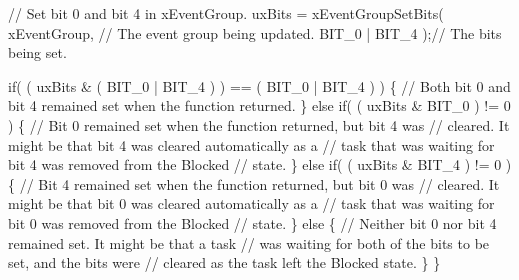 \begin{DoxyPre}    // Set bit 0 and bit 4 in xEventGroup.
    uxBits = xEventGroupSetBits(
                        xEventGroup,    // The event group being updated.
                        BIT\_0 | BIT\_4 );// The bits being set.\end{DoxyPre}



\begin{DoxyPre}    if( ( uxBits \& ( BIT\_0 | BIT\_4 ) ) == ( BIT\_0 | BIT\_4 ) )
    \{
        // Both bit 0 and bit 4 remained set when the function returned.
    \}
    else if( ( uxBits \& BIT\_0 ) != 0 )
    \{
        // Bit 0 remained set when the function returned, but bit 4 was
        // cleared.  It might be that bit 4 was cleared automatically as a
        // task that was waiting for bit 4 was removed from the Blocked
        // state.
    \}
    else if( ( uxBits \& BIT\_4 ) != 0 )
    \{
        // Bit 4 remained set when the function returned, but bit 0 was
        // cleared.  It might be that bit 0 was cleared automatically as a
        // task that was waiting for bit 0 was removed from the Blocked
        // state.
    \}
    else
    \{
        // Neither bit 0 nor bit 4 remained set.  It might be that a task
        // was waiting for both of the bits to be set, and the bits were
        // cleared as the task left the Blocked state.
    \}
  \}
  \end{DoxyPre}
 